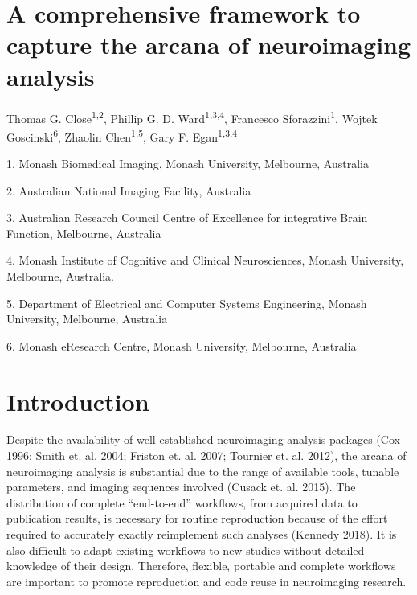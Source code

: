 \hypertarget{a-comprehensive-framework-to-capture-the-arcana-of-neuroimaging-analysis}{%
\section{A comprehensive framework to capture the arcana of neuroimaging
analysis}\label{a-comprehensive-framework-to-capture-the-arcana-of-neuroimaging-analysis}}

Thomas G. Close\textsuperscript{1,2},
Phillip G. D. Ward\textsuperscript{1,3,4},
Francesco Sforazzini\textsuperscript{1},
Wojtek Goscinski\textsuperscript{6},
Zhaolin Chen\textsuperscript{1,5},
Gary F. Egan\textsuperscript{1,3,4}

1. Monash Biomedical Imaging, Monash University, Melbourne, Australia

2. Australian National Imaging Facility, Australia

3. Australian Research Council Centre of Excellence for integrative
Brain Function, Melbourne, Australia

4. Monash Institute of Cognitive and Clinical Neurosciences, Monash
University, Melbourne, Australia.

5. Department of Electrical and Computer Systems Engineering, Monash
University, Melbourne, Australia

6. Monash eResearch Centre, Monash University, Melbourne, Australia

\hypertarget{introduction}{%
\section{Introduction}\label{introduction}}

Despite the availability of well-established neuroimaging analysis
packages (Cox 1996; Smith et. al. 2004; Friston et. al. 2007; Tournier
et. al. 2012), the arcana of neuroimaging analysis is substantial due to
the range of available tools, tunable parameters, and imaging sequences
involved (Cusack et. al. 2015). The distribution of complete
``end-to-end'' workflows, from acquired data to publication results, is
necessary for routine reproduction because of the effort required to
accurately exactly reimplement such analyses (Kennedy 2018). It is also
difficult to adapt existing workflows to new studies without detailed
knowledge of their design. Therefore, flexible, portable and complete
workflows are important to promote reproduction and code reuse in
neuroimaging research.

